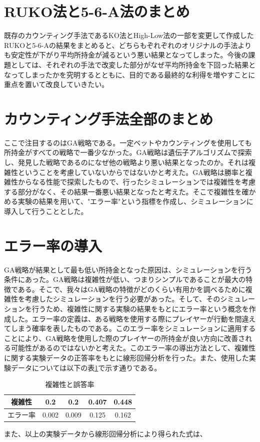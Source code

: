 \section{RUKO法と5-6-A法のまとめ}
既存のカウンティング手法であるKO法とHigh-Low法の一部を変更して作成したRUKOと5-6-Aの結果をまとめると、どちらもぞれぞれのオリジナルの手法よりも安定性が下がり平均所持金が減るという悪い結果となってしまった。今後の課題としては、それぞれの手法で改変した部分がなぜ平均所持金を下回った結果となってしまったかを究明するとともに、目的である最終的な利得を増やすことに重点を置いて改良していきたい。
\section{カウンティング手法全部のまとめ}
ここで注目するのはGA戦略である。一定ベットやカウンティングを使用しても所持金がすべての戦略で一番少なかった。GA戦略は遺伝子アルゴリズムで探索し、発見した戦略であるのになぜ他の戦略より悪い結果となったのか。それは複雑性ということを考慮していないからではないかと考えた。GA戦略は勝率と複雑性からなる性能で探索したもので、行ったシミュレーションでは複雑性を考慮する部分がなく、その結果一番悪い結果となったと考えた。そこで複雑性を確かめる実験の結果を用いて、"エラー率"という指標を作成し、シミュレーションに導入して行うこととした。

\section{エラー率の導入}
GA戦略が結果として最も低い所持金となった原因は、シミュレーションを行う条件にあった。GA戦略は複雑性が低い、つまりシンプルであることが最大の特徴である。そこで、我々はGA戦略の特徴がどのくらい有用かを調べるために複雑性を考慮したシミュレーションを行う必要があった。そして、そのシミュレーションを行うため、複雑性に関する実験の結果をもとにエラー率という概念を作成した。エラー率の定義は、ある戦略を使用する際にプレイヤーが行動を間違えてしまう確率を表したものである。このエラー率をシミュレーションに適用することにより、GA戦略を使用した際のプレイヤーの所持金が良い方向に改善される可能性があるのではないかと考えた。このエラー率の導出方法として、複雑性に関する実験データの正答率をもとに線形回帰分析を行った。また、使用した実験データについては以下の表\ref{hoge}で示す通りである。

  \begin{table}[H]
    \centering
    \caption{複雑性と誤答率}
    \begin{tabular}{|c|c|c|c|c|} \hline
      複雑性&0.2&0.2&0.407&0.448 \\ \hline
      エラー率&0.002&0.009&0.125&0.162 \\ \hline
    \end{tabular}
    \label{hoge}
  \end{table}
また、以上の実験データから線形回帰分析により得られた式は、

